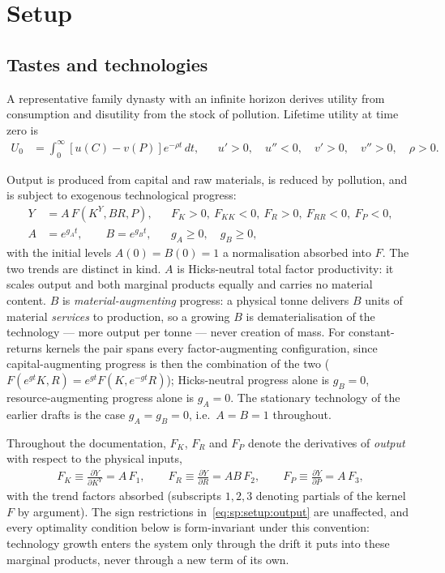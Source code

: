 ﻿\section{Setup}\label{sec:sp:setup}

\subsection{Tastes and technologies}
\label{sec:sp:setup:primitives}


 A representative family dynasty with an infinite horizon derives utility from consumption and disutility from the stock of pollution. Lifetime utility at time zero is
\begin{align}
U_0 &= \int_0^{\infty}\left[u(C)-v(P)\right]e^{-\rho t}\,dt,
&&
u'>0,\quad u''<0,\quad v'>0,\quad v''>0,\quad \rho>0.
\label{eq:sp:setup:utility}
\end{align}

 Output is produced from capital and raw materials, is reduced by
pollution, and is subject to exogenous technological progress:
\begin{align}
Y &= A\,F\left(K^Y,BR,P\right),
&&
F_K>0,\ F_{KK}<0,\ F_R>0,\ F_{RR}<0,\ F_P<0,
\label{eq:sp:setup:output}
\\
A&=e^{g_At},
\qquad
B=e^{g_Bt},
&&
g_A\ge0,\quad g_B\ge0,
\label{eq:sp:setup:tfp}
\end{align}
with the initial levels $A(0)=B(0)=1$ a normalisation absorbed into $F$. The two trends are
distinct in kind. $A$ is Hicks-neutral total factor productivity: it scales output and both
marginal products equally and carries no material content. $B$ is \emph{material-augmenting}
progress: a physical tonne delivers $B$ units of material \emph{services} to production, so a
growing $B$ is dematerialisation of the technology --- more output per tonne --- never creation
of mass. For constant-returns kernels the pair spans every factor-augmenting configuration,
since capital-augmenting progress is then the combination of the two
($F\left(e^{gt}K,R\right)=e^{gt}F\left(K,e^{-gt}R\right)$); Hicks-neutral progress alone is
$g_B=0$, resource-augmenting progress alone is $g_A=0$. The stationary technology of the
earlier drafts is the case $g_A=g_B=0$, i.e.\ $A=B=1$ throughout.

 Throughout the documentation, $F_K$, $F_R$ and
$F_P$ denote the derivatives of \emph{output} with respect to the physical inputs,
\begin{align}
F_K\equiv\frac{\partial Y}{\partial K^Y}=A\,F_1,
\qquad
F_R\equiv\frac{\partial Y}{\partial R}=AB\,F_2,
\qquad
F_P\equiv\frac{\partial Y}{\partial P}=A\,F_3,
\label{eq:sp:setup:mpconvention}
\end{align}
with the trend factors absorbed (subscripts $1,2,3$ denoting partials of the kernel $F$ by
argument). The sign restrictions in~\eqref{eq:sp:setup:output} are unaffected, and every
optimality condition below is form-invariant under this convention: technology growth enters
the system only through the drift it puts into these marginal products, never through a new
term of its own.

